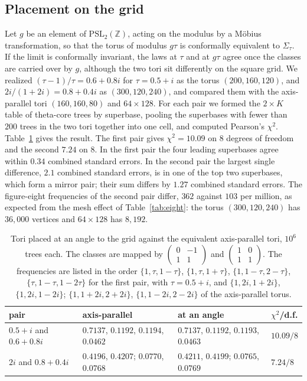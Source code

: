 \documentclass[11pt]{amsart}
\theoremstyle{definition}
\theoremstyle{remark}
\newcommand{\Z}{\mathbb{Z}}
\begin{document}
\subsection*{Placement on the grid}
Let $g$ be an element of $\mathrm{PSL}_2(\Z)$, acting on the modulus by a M\"obius transformation, so that the torus
of modulus $g\tau$ is conformally equivalent to $\Sigma_\tau$. If the limit is conformally invariant, the laws at
$\tau$ and at $g\tau$ agree once the classes are carried over by $g$, although the two tori sit differently on the
square grid. We realized $(\tau-1)/\tau=0.6+0.8i$ for $\tau=0.5+i$ as the torus $(200,160,120)$, and
$2i/(1+2i)=0.8+0.4i$ as $(300,120,240)$, and compared them with the axis-parallel tori $(160,160,80)$ and
$64\times128$. For each pair we formed the $2\times K$ table of theta-core trees by superbase, pooling the superbases
with fewer than $200$ trees in the two tori together into one cell, and computed Pearson's $\chi^2$.
Table~\ref{tab:place} gives the result. The first pair gives $\chi^2=10.09$ on $8$ degrees of freedom and the second
$7.24$ on $8$. In the first pair the four leading superbases agree within $0.34$ combined standard errors. In the
second pair the largest single difference, $2.1$ combined standard errors, is in one of the top
two superbases, which form a mirror pair; their sum differs by $1.27$ combined standard errors. The figure-eight
frequencies of the second pair differ, $362$ against $103$ per million, as expected from the mesh effect of
Table~\ref{tab:eight}: the torus $(300,120,240)$ has $36{,}000$ vertices and $64\times128$ has $8{,}192$.

\begin{table}[tbp]
\centering
\footnotesize
\setlength{\tabcolsep}{4pt}
\begin{tabular}{llll}
\toprule
pair & axis-parallel & at an angle & $\chi^2$/d.f.\\\midrule
$0.5+i$ and $0.6+0.8i$ & $0.7137$, $0.1192$, $0.1194$, $0.0462$ & $0.7137$, $0.1192$, $0.1193$, $0.0463$ & $10.09/8$\\
$2i$ and $0.8+0.4i$ & $0.4196$, $0.4207$; $0.0770$, $0.0768$ & $0.4211$, $0.4199$; $0.0765$, $0.0769$ & $7.24/8$\\\bottomrule
\end{tabular}
\medskip
\caption{Tori placed at an angle to the grid against the equivalent axis-parallel tori, $10^6$ trees each. The classes
are mapped by $\left(\begin{smallmatrix}0&-1\\1&1\end{smallmatrix}\right)$ and
$\left(\begin{smallmatrix}1&0\\1&1\end{smallmatrix}\right)$. The frequencies are listed in the order $\{1,\tau,1-\tau\}$, $\{1,\tau,1+\tau\}$, $\{1,1-\tau,2-\tau\}$,
$\{\tau,1-\tau,1-2\tau\}$ for the first pair, with $\tau=0.5+i$, and
$\{1,2i,1+2i\}$, $\{1,2i,1-2i\}$; $\{1,1+2i,2+2i\}$, $\{1,1-2i,2-2i\}$ of the axis-parallel torus.}
\label{tab:place}
\end{table}
\end{document}
